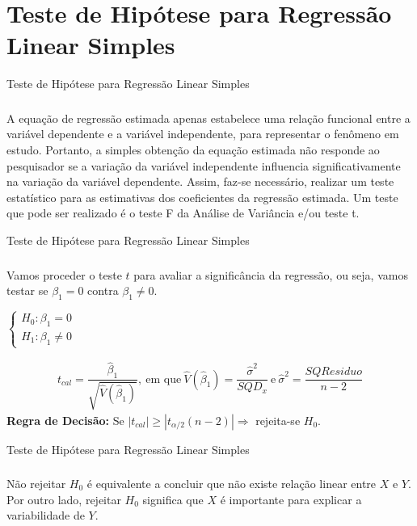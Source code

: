 \documentclass[14pt,aspectratio=1610]{beamer}
\begin{document}
\section{Teste de Hipótese para Regressão Linear Simples}
\begin{frame}{Teste de Hipótese para Regressão Linear Simples}
\frametitle{}
\begin{block}{}
\justifying
A equação de regressão estimada apenas estabelece uma relação funcional entre a variável dependente e a variável independente, para representar o fenômeno em estudo. Portanto, a simples obtenção da equação estimada não responde ao pesquisador se a variação da variável independente influencia significativamente na variação da variável dependente. Assim, faz-se necessário, realizar um teste estatístico para as estimativas dos coeficientes da regressão estimada. Um teste que pode ser realizado é o teste F da Análise de Variância e/ou teste t.

\end{block}
\end{frame}

\begin{frame}{Teste de Hipótese para Regressão Linear Simples}
\frametitle{}
\begin{block}{}
\justifying
Vamos proceder o teste $t$ para avaliar a significância da regressão, ou seja, vamos testar se $\beta_{1}=0$ contra $\beta_{1}\neq 0.$
\newline

\begin{center}
$
\begin{cases}
       H_{0}:\beta_{1}=0\\ 
       H_{1}:\beta_{1}\neq 0
\end{cases}
$
\end{center}
\begin{align*}
t_{cal}=\dfrac{\hat{\beta}_{1}}{\sqrt{\hat{V}(\hat{\beta}_{1})}},~\textrm{em que}~\hat{V}(\hat{\beta}_{1})=\dfrac{\hat{\sigma}^{2}}{SQD_{x}}~\textrm{e}~\hat{\sigma}^{2}=\dfrac{SQResiduo}{n-2}
\end{align*}
\textbf{Regra de Decisão:} Se $|t_{cal}|\geq |t_{\alpha/2}(n-2)|\Rightarrow$ rejeita-se $H_{0}.$
\end{block}
\end{frame}

\begin{frame}{Teste de Hipótese para Regressão Linear Simples}
\frametitle{}
\begin{block}{}
\justifying
Não rejeitar $H_{0}$ é equivalente a concluir que não existe relação linear entre $X$ e $Y.$ Por outro lado, rejeitar $H_{0}$ significa que $X$ é importante para explicar a variabilidade de $Y.$
\end{block}
\end{frame}
\end{document}
